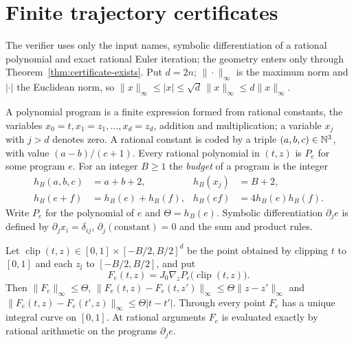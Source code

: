\section{Finite trajectory certificates}\label{sec:certificate}

The verifier uses only the input names, symbolic differentiation of a rational polynomial and exact rational Euler iteration; the geometry enters only through Theorem~\ref{thm:certificate-exists}. Put $d=2n$; $\|\cdot\|_\infty$ is the maximum norm and $|\cdot|$ the Euclidean norm, so $\|x\|_\infty\le|x|\le\sqrt d\,\|x\|_\infty\le d\|x\|_\infty$.

\begin{definition}\label{def:certificate-program}
A polynomial program is a finite expression formed from rational constants, the variables
$x_0=t,x_1=z_1,\ldots,x_d=z_d$, addition and multiplication; a variable $x_j$ with $j>d$ denotes zero. A rational
constant is coded by a triple $(a,b,c)\in\mathbb{N}^3$, with value $(a-b)/(c+1)$. Every rational polynomial in $(t,z)$ is
$P_e$ for some program $e$. For an integer $B\ge1$ the \emph{budget} of a program is the integer
\begin{align*}
 h_B(a,b,c)&=a+b+2,& h_B(x_j)&=B+2,\\
 h_B(e+f)&=h_B(e)+h_B(f),& h_B(ef)&=4h_B(e)h_B(f).
\end{align*}
Write $P_e$ for the polynomial of $e$ and $\Theta=h_B(e)$. Symbolic differentiation $\partial_je$ is defined by
$\partial_jx_i=\delta_{ij}$, $\partial_j(\text{constant})=0$ and the sum and product rules.
\end{definition}

\begin{lemma}\label{lem:certificate-field}
Let $\operatorname{clip}(t,z)\in[0,1]\times[-B/2,B/2]^d$ be the point obtained by clipping $t$ to $[0,1]$ and each
$z_l$ to $[-B/2,B/2]$, and put
\[
 F_e(t,z)=J_0\nabla_zP_e\bigl(\operatorname{clip}(t,z)\bigr).
\]
Then $\|F_e\|_\infty\le\Theta$,
$\|F_e(t,z)-F_e(t,z')\|_\infty\le\Theta\|z-z'\|_\infty$ and $\|F_e(t,z)-F_e(t',z)\|_\infty\le\Theta|t-t'|$. Through every
point $F_e$ has a unique integral curve on $[0,1]$. At rational arguments $F_e$ is evaluated exactly by rational
arithmetic on the programs $\partial_je$.
\end{lemma}


